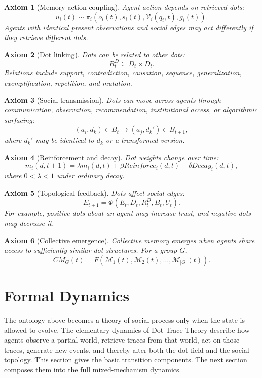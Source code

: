 \documentclass[11pt]{article}
\newtheorem{axiom}{Axiom}
\theoremstyle{remark}
\begin{document}
\begin{axiom}[Memory-action coupling]
Agent action depends on retrieved dots:
$$
u_i(t) \sim \pi_i(o_i(t),s_i(t),\mathcal V_i(q_i,t),g_i(t)).
$$
Agents with identical present observations and social edges may act differently if they retrieve different dots.
\end{axiom}

\begin{axiom}[Dot linking]
Dots can be related to other dots:
$$
R_t^D \subseteq D_t \times D_t.
$$
Relations include support, contradiction, causation, sequence, generalization, exemplification, repetition, and mutation.
\end{axiom}

\begin{axiom}[Social transmission]
Dots can move across agents through communication, observation, recommendation, institutional access, or algorithmic surfacing:
$$
(a_i,d_k)\in B_t \rightarrow (a_j,d_k')\in B_{t+1},
$$
where $d_k'$ may be identical to $d_k$ or a transformed version.
\end{axiom}

\begin{axiom}[Reinforcement and decay]
Dot weights change over time:
$$
m_i(d,t+1)=\lambda m_i(d,t)+\beta Reinforce_i(d,t)-\delta Decay_i(d,t),
$$
where $0<\lambda<1$ under ordinary decay.
\end{axiom}

\begin{axiom}[Topological feedback]
Dots affect social edges:
$$
E_{t+1}=\Phi(E_t,D_t,R_t^D,B_t,U_t).
$$
For example, positive dots about an agent may increase trust, and negative dots may decrease it.
\end{axiom}

\begin{axiom}[Collective emergence]
Collective memory emerges when agents share access to sufficiently similar dot structures. For a group $G$,
$$
CM_G(t)=F(\mathcal M_1(t),\mathcal M_2(t),\ldots,\mathcal M_{|G|}(t)).
$$
\end{axiom}



\section{Formal Dynamics}\label{formal-dynamics}

The ontology above becomes a theory of social process only when the state is allowed to evolve. The elementary dynamics of Dot-Trace Theory describe how agents observe a partial world, retrieve traces from that world, act on those traces, generate new events, and thereby alter both the dot field and the social topology. This section gives the basic transition components. The next section composes them into the full mixed-mechanism dynamics.
\end{document}
